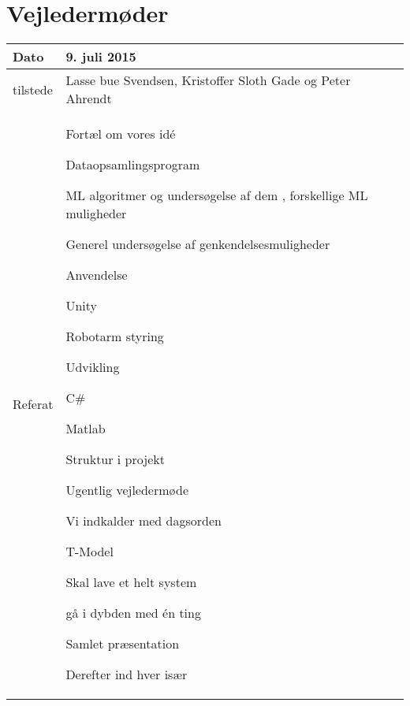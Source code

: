 \chapter{Vejledermøder}
\label{bilag:vejl}
\vspace{-1cm}
\begin{center}
	\begin{tabular}{| l | p{10cm} |}
		\hline
		Dato		& 9. juli 2015\\ \hline
		tilstede 	& Lasse bue Svendsen, Kristoffer Sloth Gade og Peter Ahrendt\\ \hline
		Referat		& \vspace{-5mm}\begin{myEnumerate}
			\item Fortæl om vores idé
			\begin{myItemize}				
				\item Dataopsamlingsprogram
				\item ML algoritmer og undersøgelse af dem , forskellige ML muligheder
				\item Generel undersøgelse af genkendelsesmuligheder
				\item Anvendelse
				\begin{myItemize}
					\item Unity
					\item Robotarm styring
				\end{myItemize}
			\end{myItemize}
			\item Udvikling
			\begin{myItemize}
				\item C\#
				\item Matlab
			\end{myItemize}
			\item Struktur i projekt
			\begin{myItemize}
				\item Ugentlig vejledermøde
				\item Vi indkalder med dagsorden
				\item T-Model
				\begin{myItemize}
					\item Skal lave et helt system
					\item gå i dybden med én ting
				\end{myItemize}
				\item Samlet præsentation
				\begin{myItemize}
					\item Derefter ind hver især

\end{myItemize}
\end{myItemize}
\end{myEnumerate}
\end{tabular}
\end{center}

